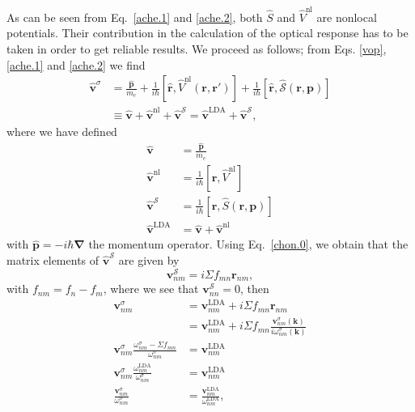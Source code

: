 As can be seen from Eq.~\eqref{ache.1} and \eqref{ache.2},
both $\hat{S}$ and $\hat{V}^{\mathrm{nl}}$ are nonlocal potentials. Their contribution 
in the calculation of the optical response has to be taken in order to
get reliable results.\cite{ismailPRL01}
We proceed as follows; from Eqs. \eqref{vop}, \eqref{ache.1} and
\eqref{ache.2}
 we find
\begin{align}\label{vop2}
\hat{\mathbf{v}}^{\sigma} &=
\frac{\hat{\mathbf{p}}}{m_{e}}
+
\frac{1}{i\hbar}[\hat{\mathbf{r}},\hat{V}^{\mathrm{nl}}(\mathbf{r},\mathbf{r}')]
+
\frac{1}{i\hbar}[\hat{\mathbf{r}},\hat{\mathcal{S}}(\mathbf{r},\mathbf{p})]
\nonumber\\
&\equiv
\hat{\mathbf{v}}
+
\hat{\mathbf{v}}^{\mathrm{nl}}
+\hat{\mathbf{v}}^\mathcal{S}
=
\hat{\mathbf{v}}^\mathrm{LDA}
+\hat{\mathbf{v}}^\mathcal{S}
,
\end{align}
where we have defined
\begin{align}\label{conhr}
\hat{\mathbf{v}}
&=\frac{\hat{\mathbf{p}}}{m_{e}}
\nonumber\\
\hat{\mathbf{v}}^{\mathrm{nl}}
&=
\frac{1}{i\hbar}[\hat{\mathbf{r}},\hat{V}^{\mathrm{nl}}]
\nonumber\\
\hat{\mathbf{v}}^\mathcal{S}
&=
\frac{1}{i\hbar}[\hat{\mathbf{r}},\hat{S}(\mathbf{r},\mathbf{p})]
\nonumber\\
\hat{\mathbf{v}}^\mathrm{LDA}
&=
\hat{\mathbf{v}}
+\hat{\mathbf{v}}^{\mathrm{nl}}
\end{align}  
with $\hat{\mathbf{p}}=-i\hbar\boldsymbol{\nabla}$ the momentum operator.
Using Eq.~\eqref{chon.0}, we obtain that the
matrix elements of $\hat{\mathbf{v}}^\mathcal{S}$ are given by
\begin{equation}\label{chon.2} 
\mathbf{v}^\mathcal{S}_{nm}=i\Sigma f_{mn}\mathbf{r}_{nm},
\end{equation}
with $f_{nm}=f_n-f_m$,
where we see that $\mathbf{v}^\mathcal{S}_{nn}=0$, then
\begin{align}\label{chon.8}
\mathbf{v}^\sigma_{nm}
&=
\mathbf{v}^\mathrm{LDA}_{nm}+i\Sigma f_{mn}\mathbf{r}_{nm}
\nonumber\\
&=
\mathbf{v}^\mathrm{LDA}_{nm}+i\Sigma f_{mn}\frac{\mathbf{v}^\sigma_{nm}(\mathbf{k})}{i\omega^\sigma_{nm}(\mathbf{k})}
\nonumber\\
\mathbf{v}^\sigma_{nm}
\frac{\omega^\sigma_{nm}-\Sigma f_{mn}}{\omega^\sigma_{nm}}
&=
\mathbf{v}^\mathrm{LDA}_{nm}
\nonumber\\
\mathbf{v}^\sigma_{nm}
\frac{\omega^{\mathrm{LDA}}_{nm}}{\omega^\sigma_{nm}}
&=
\mathbf{v}^\mathrm{LDA}_{nm}
\nonumber\\
\frac{\mathbf{v}^\sigma_{nm}}{\omega^\sigma_{nm}}
&=
\frac{\mathbf{v}^\mathrm{LDA}_{nm}}{\omega^{\mathrm{LDA}}_{nm}}
,
\end{align}
